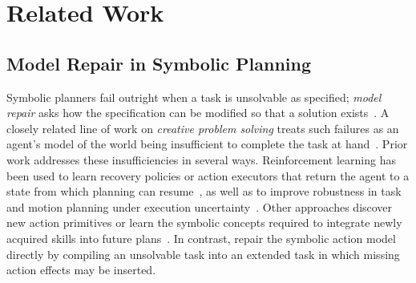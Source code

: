 \section{Related Work}
\subsection{Model Repair in Symbolic Planning}
Symbolic planners fail outright when a task is unsolvable as specified; \emph{model repair} asks how the specification can be modified so that a solution exists~\cite{bercher2025modelrepair}. A closely related line of work on \emph{creative problem solving} treats such failures as an agent's model of the world being insufficient to complete the task at hand~\cite{ijcai2023p777}. Prior work addresses these insufficiencies in several ways. Reinforcement learning has been used to learn recovery policies or action executors that return the agent to a state from which planning can resume~\cite{rapid_learn,lorang_rsj_2024, li2024learning}, as well as to improve robustness in task and motion planning under execution uncertainty~\cite{jiang2018integrating}. Other approaches discover new action primitives or learn the symbolic concepts required to integrate newly acquired skills into future plans~\cite{gizzi_ieee_2019,li2026recover}. In contrast, \citet{gragera2023repair} repair the symbolic action model directly by compiling an unsolvable task into an extended task in which missing action effects may be inserted.




